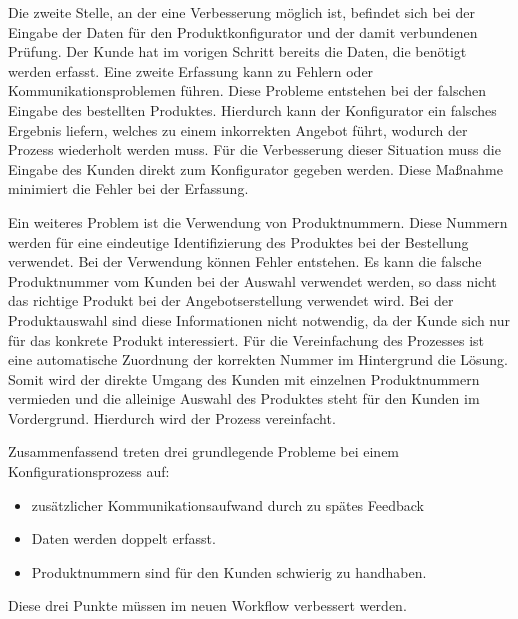 Die zweite Stelle, an der eine Verbesserung möglich ist, befindet sich bei der Eingabe der Daten für den Produktkonfigurator und der damit verbundenen Prüfung. Der Kunde hat im vorigen Schritt bereits die Daten, die benötigt werden erfasst. Eine zweite Erfassung kann zu Fehlern oder Kommunikationsproblemen führen. Diese Probleme entstehen bei der falschen Eingabe des bestellten Produktes. Hierdurch kann der Konfigurator ein falsches Ergebnis liefern, welches zu einem inkorrekten Angebot führt, wodurch der Prozess wiederholt werden muss. Für die Verbesserung dieser Situation muss die Eingabe des Kunden direkt zum Konfigurator gegeben werden. Diese Maßnahme minimiert die Fehler bei der Erfassung. \par 

Ein weiteres Problem ist die Verwendung von Produktnummern. Diese Nummern werden für eine eindeutige Identifizierung des Produktes bei der Bestellung verwendet. Bei der Verwendung können Fehler entstehen. Es kann die falsche Produktnummer vom Kunden bei der Auswahl verwendet werden, so dass nicht das richtige Produkt bei der Angebotserstellung verwendet wird. Bei der Produktauswahl sind 
diese Informationen nicht notwendig, da der Kunde sich nur für das konkrete Produkt interessiert. Für die Vereinfachung des Prozesses ist eine automatische Zuordnung der korrekten Nummer im Hintergrund die Lösung. Somit wird der direkte Umgang des Kunden mit einzelnen Produktnummern vermieden und die alleinige Auswahl des Produktes steht für den Kunden im Vordergrund. Hierdurch wird der Prozess vereinfacht. \par



Zusammenfassend treten drei grundlegende Probleme bei einem Konfigurationsprozess auf:
\begin{itemize}

		\item zusätzlicher Kommunikationsaufwand durch zu spätes Feedback

        \item Daten werden doppelt erfasst.
        \item Produktnummern sind für den Kunden schwierig zu handhaben.
        
        
\end{itemize}
Diese drei Punkte müssen im neuen Workflow verbessert werden.


